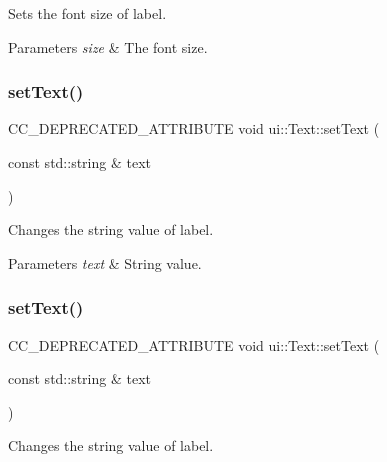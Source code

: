 Sets the font size of label.


\begin{DoxyParams}{Parameters}
{\em size} & The font size. \\
\hline
\end{DoxyParams}
\mbox{\label{classui_1_1Text_a2c5da36c598db2803c5fd0a30cc8c7c9}} 
\subsubsection{\texorpdfstring{set\+Text()}{setText()}\hspace{0.1cm}{\footnotesize\ttfamily [1/2]}}
{\footnotesize\ttfamily C\+C\+\_\+\+D\+E\+P\+R\+E\+C\+A\+T\+E\+D\+\_\+\+A\+T\+T\+R\+I\+B\+U\+TE void ui\+::\+Text\+::set\+Text (\begin{DoxyParamCaption}\item[{const std\+::string \&}]{text }\end{DoxyParamCaption})\hspace{0.3cm}{\ttfamily [inline]}}

Changes the string value of label.


\begin{DoxyParams}{Parameters}
{\em text} & String value. \\
\hline
\end{DoxyParams}
\mbox{\label{classui_1_1Text_a2c5da36c598db2803c5fd0a30cc8c7c9}} 
\subsubsection{\texorpdfstring{set\+Text()}{setText()}\hspace{0.1cm}{\footnotesize\ttfamily [2/2]}}
{\footnotesize\ttfamily C\+C\+\_\+\+D\+E\+P\+R\+E\+C\+A\+T\+E\+D\+\_\+\+A\+T\+T\+R\+I\+B\+U\+TE void ui\+::\+Text\+::set\+Text (\begin{DoxyParamCaption}\item[{const std\+::string \&}]{text }\end{DoxyParamCaption})\hspace{0.3cm}{\ttfamily [inline]}}

Changes the string value of label.


